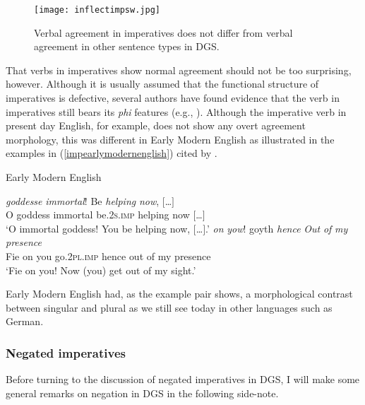\begin{figure}[bt]
\centering
	\texttt{[image: inflectimpsw.jpg]}
	\caption{Verbal agreement in imperatives does not differ from verbal agreement in other sentence types in DGS.}
	\label{fig:inflectimp}
\end{figure}

That verbs in imperatives show normal agreement should not be too surprising, however. Although it is usually assumed that the functional structure of imperatives is defective, several authors have found evidence that the verb in imperatives still bears its \textit{phi} features (e.g., \citealt{henry1995belfast, rupp2002syntax}). Although the imperative verb in present day English, for example, does not show any overt agreement morphology, this was different in Early Modern English as illustrated in the examples in (\ref{impearlymodernenglish}) cited by \citet[25]{rupp2002syntax}.

\begin{exe}
\ex Early Modern English \citep[25]{rupp2002syntax}\label{impearlymodernenglish}\begin{xlist}
\ex {} {\textit{goddesse}} {\textit{immortal}!} {Be} {\textit{helping}} {\textit{now},} {$[$\dots$]$}  \\
{O} {goddess} {immortal} {be.\textsc{2s.imp}} {helping} {now} {$[$\dots$]$} \\
\trans `O immortal goddess! You be helping now, $[$\dots$]$.' \label{ex:impearlymodernenglisha}
\ex {} {\textit{on}} {\textit{yow}!} {goyth} {\textit{hence}} {\textit{Out}} {\textit{of}} {\textit{my}} {\textit{presence}}   \\
{Fie} {on} {you} {go.\textsc{2pl.imp}} {hence} {out} {of} {my} {presence} \\
\trans `Fie on you! Now (you) get out of my sight.' \label{ex:impearlymodernenglishb}
\end{xlist}
\end{exe}

\noindent Early Modern English had, as the example pair shows, a morphological contrast between singular and plural as we still see today in other languages such as German.

\subsubsection{Negated imperatives}
Before turning to the discussion of negated imperatives in DGS, I will make some general remarks on negation in DGS in the following side-note.\label{negationnegaation}

